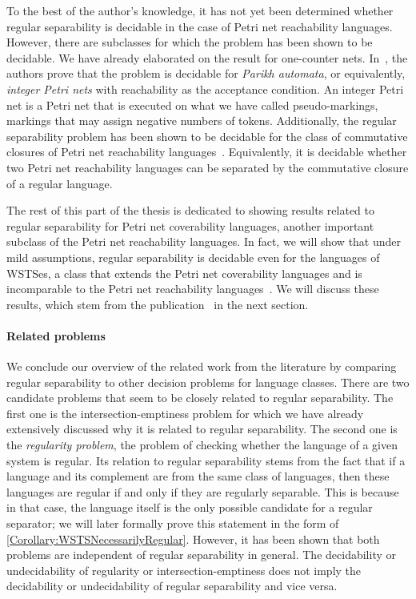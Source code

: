 \documentclass[../../diss.tex]{subfiles}
\begin{document}
To the best of the author's knowledge, it has not yet been determined whether regular separability is decidable in the case of Petri net reachability languages.
However, there are subclasses for which the problem has been shown to be decidable.
We have already elaborated on the result for one-counter nets.
In~\cite{ClementeCLP17}, the authors prove that the problem is decidable for \emph{Parikh automata}, or equivalently, \emph{integer Petri nets} with reachability as the acceptance condition.
An integer Petri net is a Petri net that is executed on what we have called pseudo-markings, markings that may assign negative numbers of tokens.
%
Additionally, the regular separability problem has been shown to be decidable for the class of commutative closures of Petri net reachability languages~\cite{ClementeCLP17b}.
Equivalently, it is decidable whether two Petri net reachability languages can be separated by the commutative closure of a regular language.

The rest of this part of the thesis is dedicated to showing results related to regular separability for Petri net coverability languages, another important subclass of the Petri net reachability languages.
In fact, we will show that under mild assumptions, regular separability is decidable even for the languages of WSTSes, a class that extends the Petri net coverability languages and is incomparable to the Petri net reachability languages~\cite{GeeraertsRV07}.
We will discuss these results, which stem from the publication~\cite{CzerwinskiLMMKS18} in the next section.

\paragraph{Related problems}

We conclude our overview of the related work from the literature by comparing regular separability to other decision problems for language classes.
There are two candidate problems that seem to be closely related to regular separability.
The first one is the intersection-emptiness problem for which we have already  extensively discussed why it is related to regular separability.
The second one is the \emph{regularity problem}, the problem of checking whether the language of a given system is regular.
Its relation to regular separability stems from the fact that if a language and its complement are from the same class of languages, then these languages are regular if and only if they are regularly separable.
This is because in that case, the language itself is the only possible candidate for a regular separator; we will later formally prove this statement in the form of \cref{Corollary:WSTSNecessarilyRegular}.
However, it has been shown that both problems are independent of regular separability in general.
The decidability or undecidability of regularity or intersection-emptiness does not imply the decidability or undecidability of regular separability and vice versa.
\end{document}
